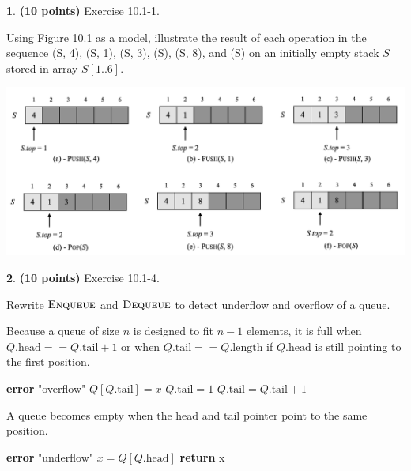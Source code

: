 \documentclass[11pt]{article}
\theoremstyle{definition}
\theoremstyle{theorem}
\newtheorem{prob}{}
\newcommand{\solution}{\medskip\noindent{\color{DarkBlue}\textbf{Solution:}}}
\begin{document}
\newpage
\begin{prob} \textbf{(10 points)} Exercise 10.1-1.
\end{prob}
Using Figure 10.1 as a model, illustrate the result of each operation in the sequence (S, 4), (S, 1), (S, 3), (S), (S, 8), and (S) on an initially empty stack $S$ stored in array $S[1..6]$.

\solution

\includegraphics[scale=0.65]{./hw7-8q3.png}


\newpage
\begin{prob} \textbf{(10 points)} Exercise 10.1-4.
\end{prob}
Rewrite $\textproc{\textsc{Enqueue}}$ and $\textproc{\textsc{Dequeue}}$ to detect underflow and overflow of a queue.

\solution

Because a queue of size $n$ is designed to fit $n-1$ elements, it is full when $Q.\text{head} == Q.\text{tail} + 1$ or when $Q.\text{tail} == Q.\text{length}$ if $Q.\text{head}$ is still pointing to the first position.
\begin{algorithmic}[1]
		\State \textbf{error} "overflow" 
	\EndIf
	\State $Q[Q.\text{tail}] = x$
            	\State $Q.\text{tail} = 1$
        \Else 
        		\State $Q.\text{tail} = Q.\text{tail} + 1$
	\EndIf
\EndFunction
\end{algorithmic}

A queue becomes empty when the head and tail pointer point to the same position.
\begin{algorithmic}[1]
		\State \textbf{error} "underflow" 
	\EndIf
	\State $x = Q[Q.\text{head}]$
        \Else
	\EndIf
        \State \textbf{return} x
\EndFunction
\end{algorithmic}
\end{document}
